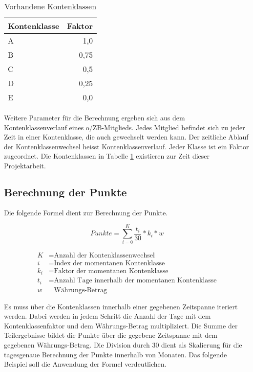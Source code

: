 \documentclass[12pt]{scrreprt}
\begin{document}
\begin{table}
  \begin{center}
    \begin{tabular}{|l|r|}
      \hline
      \textbf{Kontenklasse} & \textbf{Faktor}\\
      \hline
      A & 1,0\\
      \hline
      B & 0,75\\
      \hline
      C & 0,5\\
      \hline
      D & 0,25\\
      \hline
      E & 0,0\\
      \hline
    \end{tabular}
    \caption{Vorhandene Kontenklassen}
    \label{kkl}
  \end{center}
\end{table}
\vspace{2mm}

Weitere Parameter für die Berechnung ergeben sich aus dem Kontenklassenverlauf eines o/ZB-Mitglieds. Jedes Mitglied befindet sich zu jeder Zeit in einer Kontenklasse, die auch gewechselt werden kann. Der zeitliche Ablauf der Kontenklassenwechsel heisst Kontenklassenverlauf. Jeder Klasse ist ein Faktor zugeordnet. Die Kontenklassen in Tabelle \ref{kkl} existieren zur Zeit dieser Projektarbeit. \\

\subsection{Berechnung der Punkte}
Die folgende Formel dient zur Berechnung der Punkte. 

\begin{equation*}
  Punkte = \sum_{i=0}^{K} \frac{t_i}{30} * k_i * w
\end{equation*}

\begin{align*}
 K &= \text{Anzahl der Kontenklassenwechsel} \\
 i &= \text{Index der momentanen Kontenklasse} \\
 k_i &= \text{Faktor der momentanen Kontenklasse} \\
 t_i &= \text{Anzahl Tage innerhalb der momentanen Kontenklasse} \\
 w &= \text{Währungs-Betrag} 
\end{align*}

Es muss über die Kontenklassen innerhalb einer gegebenen Zeitspanne iteriert werden. Dabei werden in jedem Schritt die Anzahl der Tage mit dem Kontenklassenfaktor und dem Währungs-Betrag multipliziert. Die Summe der Teilergebnisse bildet die Punkte über die gegebene Zeitspanne mit dem gegebenen Währungs-Betrag. Die Division durch 30 dient als Skalierung für die tagesgenaue Berechnung der Punkte innerhalb von Monaten. Das folgende Beispiel soll die Anwendung der Formel verdeutlichen.
\end{document}
